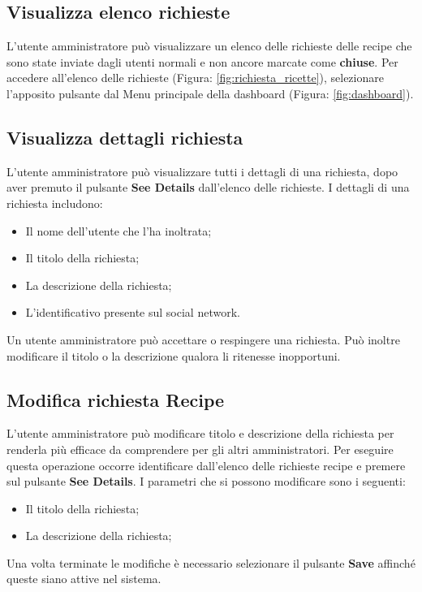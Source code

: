 	\pagebreak
	\subsection{Visualizza elenco richieste}
		L'utente amministratore può visualizzare un elenco delle richieste delle recipe\gloss{} che sono state inviate dagli utenti normali e non ancore marcate come \textbf{chiuse}.\newline
		Per accedere all'elenco delle richieste (Figura: \ref{fig:richiesta_ricette}), selezionare l'apposito pulsante dal Menu principale della dashboard\gloss{} (Figura: \ref{fig:dashboard}).
	

	\subsection{Visualizza dettagli richiesta}
		L'utente amministratore può visualizzare tutti i dettagli di una richiesta, dopo aver premuto il pulsante \textbf{See Details} dall'elenco delle richieste.\newline
		I dettagli di una richiesta includono:
		\begin{itemize}
			\item Il nome dell'utente che l'ha inoltrata;
			\item Il titolo della richiesta;
			\item La descrizione della richiesta;
			\item L'identificativo presente sul social network.
		\end{itemize}
		Un utente amministratore può accettare o respingere una richiesta.\newline
		Può inoltre modificare il titolo o la descrizione qualora li ritenesse inopportuni.
	
	
	\subsection{Modifica richiesta Recipe}
		L'utente amministratore può modificare titolo e descrizione della richiesta per renderla più efficace da comprendere per gli altri amministratori.
		Per eseguire questa operazione occorre identificare dall'elenco delle richieste recipe\gloss{} e premere sul pulsante \textbf{See Details}.
		I parametri che si possono modificare sono i seguenti:
		\begin{itemize}
		 	\item Il titolo della richiesta;
		 	\item La descrizione della richiesta;
		\end{itemize}
		Una volta terminate le modifiche è necessario selezionare il pulsante \textbf{Save} affinché queste siano attive nel sistema.


